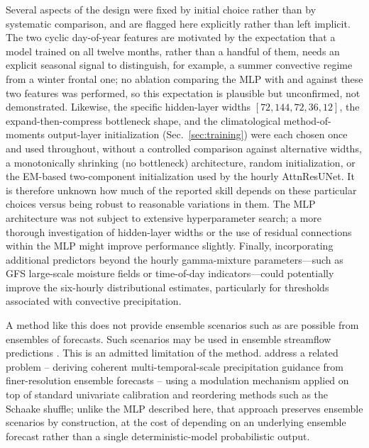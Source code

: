 \documentclass[11pt]{article}
\begin{document}
Several aspects of the design were fixed by initial choice rather than by
systematic comparison, and are flagged here explicitly rather than left
implicit.  The two cyclic day-of-year features are motivated by the
expectation that a model trained on all twelve months, rather than a
handful of them, needs an explicit seasonal signal to distinguish, for
example, a summer convective regime from a winter frontal one; no ablation
comparing the MLP with and against these two features was performed, so
this expectation is plausible but unconfirmed, not demonstrated.  Likewise,
the specific hidden-layer widths $[72, 144, 72, 36, 12]$, the
expand-then-compress bottleneck shape, and the climatological method-of-
moments output-layer initialization (Sec.~\ref{sec:training}) were each
chosen once and used throughout, without a controlled comparison against
alternative widths, a monotonically shrinking (no bottleneck) architecture,
random initialization, or the EM-based two-component initialization used by
the hourly AttnResUNet.  It is therefore unknown how much of the reported
skill depends on these particular choices versus being robust to
reasonable variations in them.  The MLP architecture was not subject
to extensive hyperparameter search; a more thorough investigation of
hidden-layer widths or the use of residual connections within the MLP
might improve performance slightly.  Finally, incorporating additional predictors
beyond the hourly gamma-mixture parameters---such as GFS large-scale
moisture fields or time-of-day indicators---could potentially improve
the six-hourly distributional estimates, particularly for thresholds
associated with convective precipitation.

A method like this does not provide ensemble scenarios such as are
possible from ensembles of forecasts.  Such scenarios may be used in
ensemble streamflow predictions \citep{schaake2007hepex}.  This is an
admitted limitation of the method.  \citet{bellier2023} address a related
problem -- deriving coherent multi-temporal-scale precipitation guidance
from finer-resolution ensemble forecasts -- using a modulation mechanism
applied on top of standard univariate calibration and reordering methods
such as the Schaake shuffle; unlike the MLP described here, that approach
preserves ensemble scenarios by construction, at the cost of depending on
an underlying ensemble forecast rather than a single deterministic-model
probabilistic output.
\end{document}

